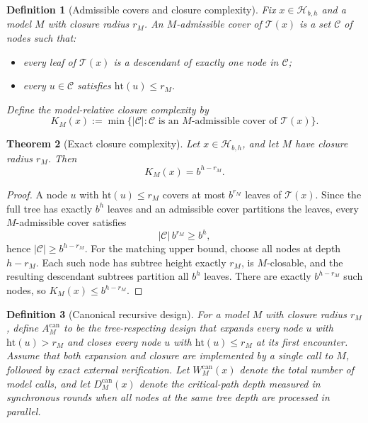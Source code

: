 \documentclass[10pt]{article}
\theoremstyle{paperplain}
\newtheorem{theorem}{Theorem}[section]
\theoremstyle{paperdefinition}
\newtheorem{definition}[theorem]{Definition}
\theoremstyle{paperremark}
\begin{document}
\begin{definition}[Admissible covers and closure complexity]
\label{def:closure-complexity}
Fix $x\in\mathcal H_{b,h}$ and a model $M$ with closure radius $r_M$.
An $M$-admissible cover of $\mathcal T(x)$ is a set $\mathcal C$ of nodes such that:
\begin{itemize}
\item every leaf of $\mathcal T(x)$ is a descendant of exactly one node in $\mathcal C$;
\item every $u\in\mathcal C$ satisfies $\mathrm{ht}(u)\le r_M$.
\end{itemize}
Define the model-relative closure complexity by
\[
K_M(x):=\min\{|\mathcal C|:\mathcal C \text{ is an } M\text{-admissible cover of } \mathcal T(x)\}.
\]
\end{definition}

\begin{theorem}[Exact closure complexity]
\label{thm:closure-complexity}
Let $x\in\mathcal H_{b,h}$, and let $M$ have closure radius $r_M$.
Then
\[
K_M(x)=b^{h-r_M}.
\]
\end{theorem}

\begin{proof}
A node $u$ with $\mathrm{ht}(u)\le r_M$ covers at most $b^{r_M}$ leaves of $\mathcal T(x)$.
Since the full tree has exactly $b^h$ leaves and an admissible cover partitions the leaves, every $M$-admissible cover satisfies
\[
|\mathcal C|\, b^{r_M}\ge b^h,
\]
hence $|\mathcal C|\ge b^{h-r_M}$.
For the matching upper bound, choose all nodes at depth $h-r_M$.
Each such node has subtree height exactly $r_M$, is $M$-closable, and the resulting descendant subtrees partition all $b^h$ leaves.
There are exactly $b^{h-r_M}$ such nodes, so $K_M(x)\le b^{h-r_M}$.
\end{proof}

\begin{definition}[Canonical recursive design]
\label{def:canonical-recursive-design}
For a model $M$ with closure radius $r_M$, define $A_M^{\mathrm{can}}$ to be the tree-respecting design that expands every node $u$ with $\mathrm{ht}(u)>r_M$ and closes every node $u$ with $\mathrm{ht}(u)\le r_M$ at its first encounter.
Assume that both expansion and closure are implemented by a single call to $M$, followed by exact external verification.
Let $W_M^{\mathrm{can}}(x)$ denote the total number of model calls, and let $D_M^{\mathrm{can}}(x)$ denote the critical-path depth measured in synchronous rounds when all nodes at the same tree depth are processed in parallel.
\end{definition}
\end{document}

